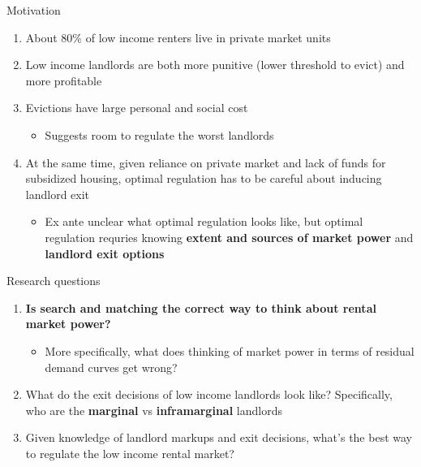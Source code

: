 \documentclass[10pt, xcolor=dvipsnames]{beamer}
\begin{document}
\begin{frame}{Motivation}
    \begin{enumerate}
        \item About 80\% of low income renters live in private market units \parencite{jchs_2024, nhpd2024profiles}
        \pause
        \item Low income landlords are both more punitive (lower threshold to evict) and more profitable \parencite{Desmond_2019, Eisfeldt_2015,Damen_2025}
        \item Evictions have large personal and social cost \parencite{desmond-evicted,humphries2025, collison-et-al-2023}
        \begin{itemize}
            \item Suggests room to regulate the worst landlords
        \end{itemize}
        \pause
        \item At the same time, given reliance on private market and lack of funds for subsidized housing, optimal regulation has to be careful about inducing landlord exit
        \begin{itemize}
            \item Ex ante unclear what optimal regulation looks like, but optimal regulation requries knowing \textbf{extent and sources of market power} and \textbf{landlord exit options}
        \end{itemize}
    \end{enumerate}

\end{frame}

\begin{frame}{Research questions}

\begin{enumerate}
    \item \textbf{Is search and matching the correct way to think about rental market power?}
    \begin{itemize}
        \item More specifically, what does thinking of market power in terms of residual demand curves get wrong?
    \end{itemize}
    \pause
    \item What do the exit decisions of low income landlords look like? Specifically, who are the \textbf{marginal} vs \textbf{inframarginal} landlords
    \pause
    \item Given knowledge of landlord markups and exit decisions, what's the best way to regulate the low income rental market?
\end{enumerate}

\end{frame}
\end{document}
